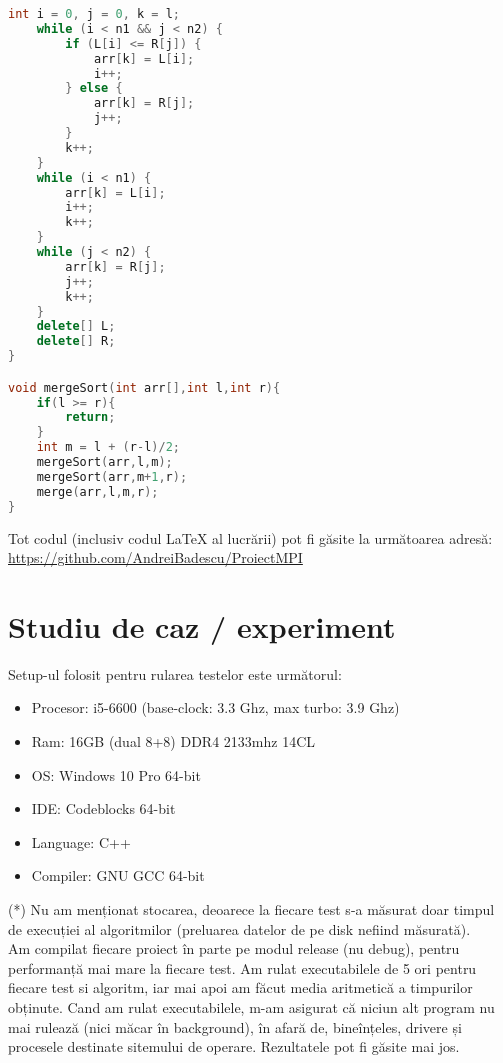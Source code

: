 \documentclass[12pt]{article}
\begin{document}
\begin{itemize}
\begin{lstlisting}[language=C++, caption={Merge sort}, label=cod:part]
    int i = 0, j = 0, k = l;
    while (i < n1 && j < n2) {
        if (L[i] <= R[j]) {
            arr[k] = L[i];
            i++;
        } else {
            arr[k] = R[j];
            j++;
        }
        k++;
    }
    while (i < n1) {
        arr[k] = L[i];
        i++;
        k++;
    }
    while (j < n2) {
        arr[k] = R[j];
        j++;
        k++;
    }
    delete[] L;
    delete[] R;
}

void mergeSort(int arr[],int l,int r){
    if(l >= r){
        return;
    }
    int m = l + (r-l)/2;
    mergeSort(arr,l,m);
    mergeSort(arr,m+1,r);
    merge(arr,l,m,r);
}
\end{lstlisting}
\end{itemize}


\indent Tot codul (inclusiv codul LaTeX al lucrării) pot fi găsite la următoarea adresă:\\
\indent\url{https://github.com/AndreiBadescu/ProiectMPI}

\section{Studiu de caz / experiment}
\indent Setup-ul folosit pentru rularea testelor este următorul:
\begin{itemize}
    \item Procesor: i5-6600 (base-clock: 3.3 Ghz, max turbo: 3.9 Ghz)
    \item Ram: 16GB (dual 8+8) DDR4 2133mhz 14CL 
    \item OS: Windows 10 Pro 64-bit 
    \item IDE: Codeblocks 64-bit 
    \item Language: C++
    \item Compiler: GNU GCC 64-bit
\end{itemize}
\indent (*) Nu am menționat stocarea, deoarece la fiecare test s-a măsurat doar timpul
de execuției al algoritmilor (preluarea datelor de pe disk nefiind măsurată).\\

Am compilat fiecare proiect în parte pe modul release (nu debug), pentru
performanță mai mare la fiecare test. Am rulat executabilele de 5 ori pentru fiecare
test si algoritm, iar mai apoi am făcut media aritmetică a timpurilor obținute. Cand
am rulat executabilele, m-am asigurat că niciun alt program nu mai rulează (nici măcar
în background), în afară de, bineînțeles, drivere și procesele destinate sitemului de operare. Rezultatele pot fi găsite mai jos.\\
\end{document}
